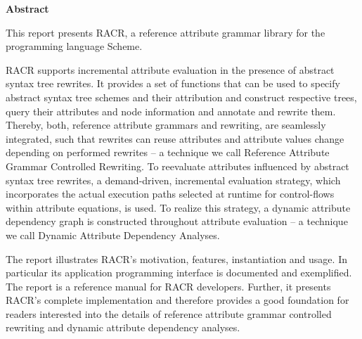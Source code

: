 

\cleardoublepage\thispagestyle{empty}
\begin{center}{\bfseries Abstract}\end{center}
\begin{onehalfspace}
This report presents RACR, a reference attribute grammar library for the programming language Scheme.

\vspace{7pt}

RACR supports incremental attribute evaluation in the presence of abstract syntax tree rewrites. It
provides a set of functions that can be used to specify abstract syntax tree schemes and their
attribution and construct respective trees, query their attributes and node information and annotate
and rewrite them. Thereby, both, reference attribute grammars and rewriting, are seamlessly integrated,
such that rewrites can reuse attributes and attribute values change depending on performed rewrites –
a technique we call Reference Attribute Grammar Controlled Rewriting. To reevaluate attributes
influenced by abstract syntax tree rewrites, a demand-driven, incremental evaluation strategy, which
incorporates the actual execution paths selected at runtime for control-flows within attribute
equations, is used. To realize this strategy, a dynamic attribute dependency graph is constructed
throughout attribute evaluation – a technique we call Dynamic Attribute Dependency Analyses.

\vspace{7pt}

The report illustrates RACR's motivation, features, instantiation and usage. In particular its
application programming interface is documented and exemplified. The report is a reference manual for
RACR developers. Further, it presents RACR’s complete implementation and therefore provides a good
foundation for readers interested into the details of reference attribute grammar controlled rewriting
and dynamic attribute dependency analyses.
\end{onehalfspace}
\vfill\null
